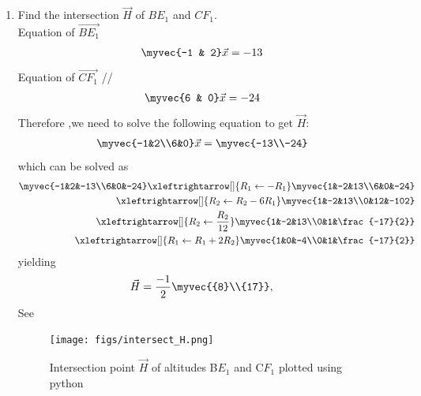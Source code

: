 \documentclass[11pt]{book}
\begin{document}
\begin{enumerate}[label=\thesection.\arabic*.,ref=\thesection.\theenumi]
\item Find the intersection $\vec{H}$ of $BE_1$ and $CF_1$.
 \\  \solution Equation of $\vec{BE_1}$ \\
\begin{align}
    \myvec{-1 & 2}\vec{x}&= -13
\end{align}
Equation of $\vec{CF_1}$ //
\begin{align}
    \myvec{6 & 0}\vec{x}&=-24
\end{align}
Therefore ,we need to solve the following equation to get $\vec{H}:$ \\
\begin{align}
        \myvec{-1&2\\6&0} \vec{x} &= \myvec{-13\\-24}
\end{align}
%
which can be solved as 
%
\begin{align}
        \myvec{-1&2&-13\\6&0&-24}
	 \xleftrightarrow[]{R_1 \leftarrow - R_1}
        \myvec{1&-2&13\\6&0&-24}\\
	 \xleftrightarrow[]{R_2 \leftarrow R_2-6R_1}
        \myvec{1&-2&13\\0&12&-102} \\
	 \xleftrightarrow[]{R_2 \leftarrow \frac{R_2}{12}}
        \myvec{1&-2&13\\0&1&\frac{-17}{2}} \\
         \xleftrightarrow[]{R_1 \leftarrow R_1+2R_2}
        \myvec{1&0&-4\\0&1&\frac{-17}{2}}
\end{align}
%
yielding
%
\begin{align}
        \vec{H}&=\frac{-1}{2}\myvec{{8}\\{17}}
		\label{eq:geo-alt-H},
\end{align}
%
See 
\begin{figure}[H]
\centering
\texttt{[image: figs/intersect\_H.png]}
\caption{Intersection point $\vec{H}$ of altitudes B$E_{1}$ and C$F_{1}$ plotted using python}
\label{fig:m_tri_py}
\end{figure}


\end{enumerate}
\end{document}

